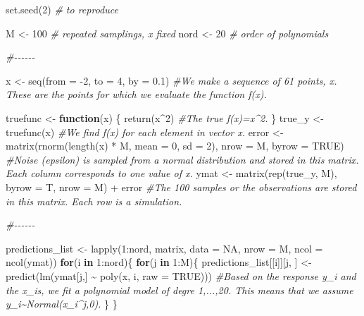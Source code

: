 \documentclass[
]{article}
\newenvironment{Shaded}{\begin{snugshade}}{\end{snugshade}}
\newcommand{\AttributeTok}[1]{\textcolor[rgb]{0.77,0.63,0.00}{#1}}
\newcommand{\CommentTok}[1]{\textcolor[rgb]{0.56,0.35,0.01}{\textit{#1}}}
\newcommand{\ConstantTok}[1]{\textcolor[rgb]{0.00,0.00,0.00}{#1}}
\newcommand{\ControlFlowTok}[1]{\textcolor[rgb]{0.13,0.29,0.53}{\textbf{#1}}}
\newcommand{\DecValTok}[1]{\textcolor[rgb]{0.00,0.00,0.81}{#1}}
\newcommand{\FloatTok}[1]{\textcolor[rgb]{0.00,0.00,0.81}{#1}}
\newcommand{\FunctionTok}[1]{\textcolor[rgb]{0.00,0.00,0.00}{#1}}
\newcommand{\NormalTok}[1]{#1}
\newcommand{\OtherTok}[1]{\textcolor[rgb]{0.56,0.35,0.01}{#1}}
\newcommand{\SpecialCharTok}[1]{\textcolor[rgb]{0.00,0.00,0.00}{#1}}
\begin{document}
\begin{Shaded}
\begin{Highlighting}[]
\FunctionTok{set.seed}\NormalTok{(}\DecValTok{2}\NormalTok{) }\CommentTok{\# to reproduce}

\NormalTok{M }\OtherTok{\textless{}{-}} \DecValTok{100} \CommentTok{\# repeated samplings, x fixed}
\NormalTok{nord }\OtherTok{\textless{}{-}} \DecValTok{20} \CommentTok{\# order of polynomials}

\CommentTok{\#{-}{-}{-}{-}{-}{-}}

\NormalTok{x }\OtherTok{\textless{}{-}} \FunctionTok{seq}\NormalTok{(}\AttributeTok{from =} \SpecialCharTok{{-}}\DecValTok{2}\NormalTok{, }\AttributeTok{to =} \DecValTok{4}\NormalTok{, }\AttributeTok{by =} \FloatTok{0.1}\NormalTok{) }\CommentTok{\#We make a sequence of 61 points, x. These are the points for which we evaluate the function f(x).}

\NormalTok{truefunc }\OtherTok{\textless{}{-}} \ControlFlowTok{function}\NormalTok{(x) \{}
  \FunctionTok{return}\NormalTok{(x}\SpecialCharTok{\^{}}\DecValTok{2}\NormalTok{) }\CommentTok{\#The true f(x)=x\^{}2. }
\NormalTok{\}}
\NormalTok{true\_y }\OtherTok{\textless{}{-}} \FunctionTok{truefunc}\NormalTok{(x) }\CommentTok{\#We find f(x) for each element in vector x.}
\NormalTok{error }\OtherTok{\textless{}{-}} \FunctionTok{matrix}\NormalTok{(}\FunctionTok{rnorm}\NormalTok{(}\FunctionTok{length}\NormalTok{(x) }\SpecialCharTok{*}\NormalTok{ M, }\AttributeTok{mean =} \DecValTok{0}\NormalTok{, }\AttributeTok{sd =} \DecValTok{2}\NormalTok{),}
                \AttributeTok{nrow =}\NormalTok{ M,}
                \AttributeTok{byrow =} \ConstantTok{TRUE}\NormalTok{) }\CommentTok{\#Noise (epsilon) is sampled from a normal distribution and stored in this matrix. Each column corresponds to one value of x.}
\NormalTok{ymat }\OtherTok{\textless{}{-}} \FunctionTok{matrix}\NormalTok{(}\FunctionTok{rep}\NormalTok{(true\_y, M), }\AttributeTok{byrow =}\NormalTok{ T, }\AttributeTok{nrow =}\NormalTok{ M) }\SpecialCharTok{+}\NormalTok{ error  }\CommentTok{\#The 100 samples or the observations are stored in this matrix. Each row is a simulation.}

\CommentTok{\#{-}{-}{-}{-}{-}{-}}

\NormalTok{predictions\_list }\OtherTok{\textless{}{-}} \FunctionTok{lapply}\NormalTok{(}\DecValTok{1}\SpecialCharTok{:}\NormalTok{nord, matrix, }\AttributeTok{data =} \ConstantTok{NA}\NormalTok{, }\AttributeTok{nrow =}\NormalTok{ M, }\AttributeTok{ncol =} \FunctionTok{ncol}\NormalTok{(ymat))}
\ControlFlowTok{for}\NormalTok{(i }\ControlFlowTok{in} \DecValTok{1}\SpecialCharTok{:}\NormalTok{nord)\{}
  \ControlFlowTok{for}\NormalTok{(j }\ControlFlowTok{in} \DecValTok{1}\SpecialCharTok{:}\NormalTok{M)\{}
\NormalTok{    predictions\_list[[i]][j, ] }\OtherTok{\textless{}{-}} \FunctionTok{predict}\NormalTok{(}\FunctionTok{lm}\NormalTok{(ymat[j,] }\SpecialCharTok{\textasciitilde{}} \FunctionTok{poly}\NormalTok{(x, i, }\AttributeTok{raw =} \ConstantTok{TRUE}\NormalTok{))) }\CommentTok{\#Based on the response y\_i and the x\_i\textquotesingle{}s, we fit a polynomial model of degre 1,...,20. This means that we assume y\_i\textasciitilde{}Normal(x\_i\^{}j,0). }
\NormalTok{  \}}
\NormalTok{\}}


\end{Highlighting}
\end{Shaded}
\end{document}
